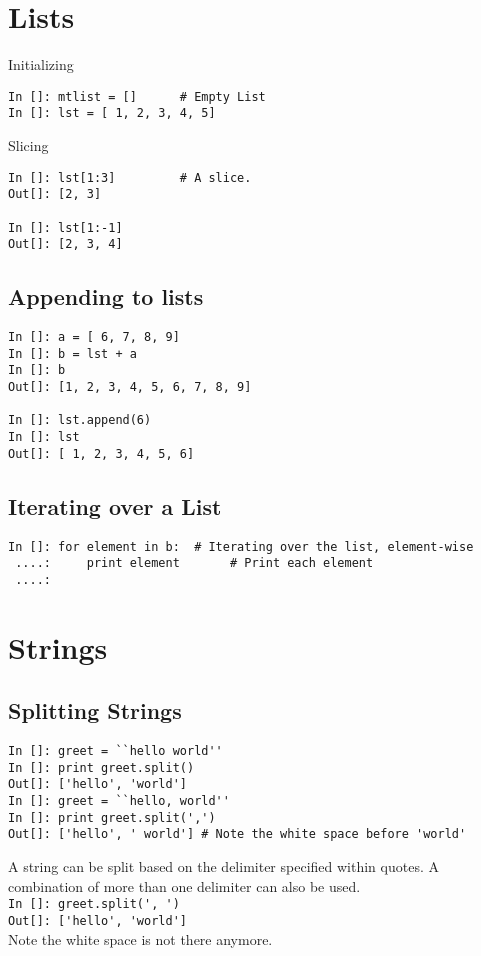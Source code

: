 \documentclass[12pt]{article}
\newcommand{\typ}[1]{\lstinline{#1}}
\begin{document}
\section{Lists}

Initializing
  \begin{lstlisting}
In []: mtlist = []      # Empty List
In []: lst = [ 1, 2, 3, 4, 5] 
  \end{lstlisting}
Slicing
\begin{lstlisting}
In []: lst[1:3]         # A slice.
Out[]: [2, 3]

In []: lst[1:-1]
Out[]: [2, 3, 4]
\end{lstlisting}
\subsection{Appending to lists}
\begin{lstlisting}
In []: a = [ 6, 7, 8, 9]
In []: b = lst + a
In []: b
Out[]: [1, 2, 3, 4, 5, 6, 7, 8, 9]

In []: lst.append(6)
In []: lst
Out[]: [ 1, 2, 3, 4, 5, 6]
\end{lstlisting}
\subsection{Iterating over a List}
\begin{lstlisting}
In []: for element in b:  # Iterating over the list, element-wise
 ....:     print element       # Print each element
 ....:
\end{lstlisting}

\section{Strings}
\subsection{Splitting Strings}
\begin{lstlisting}
In []: greet = ``hello world''
In []: print greet.split()
Out[]: ['hello', 'world']
In []: greet = ``hello, world''
In []: print greet.split(',')
Out[]: ['hello', ' world'] # Note the white space before 'world'
\end{lstlisting}
A string can be split based on the delimiter specified within quotes. A combination of more than one delimiter can also be used.\\
\typ{In []: greet.split(', ')}\\
\typ{Out[]: ['hello', 'world']}\\Note the white space is not there anymore.
\newpage
\end{document}
